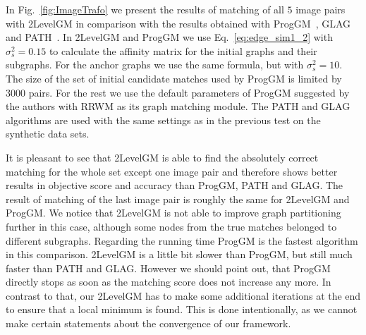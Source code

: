 In Fig.~\ref{fig:ImageTrafo} we present the results of matching of all $5$ image pairs with 2LevelGM in comparison with the results obtained with ProgGM~\cite{Cho2012_ProgressiveGM}, GLAG~\cite{Fiori2013_GLAG} and PATH~\cite{Zazlavskiy2008_PATH}. %
In 2LevelGM and ProgGM we use Eq.~\eqref{eq:edge_sim1_2} with $\sigma_s^2=0.15$ to calculate the affinity matrix for the initial graphs and their subgraphs. For the anchor graphs we use the same formula, but with $\sigma^2_s=10$. The size of the set of initial candidate matches used by ProgGM is limited by $3000$ pairs. For the rest we use the default parameters of ProgGM suggested by the authors with RRWM as its graph matching module. The PATH and GLAG algorithms are used with the same settings as in the previous test on the synthetic data sets.

It is pleasant to see that 2LevelGM is able to find the absolutely correct matching for the whole set except one image pair and therefore shows better results in objective score and accuracy than ProgGM, PATH and GLAG. The result of matching of the last image pair is roughly the same for 2LevelGM and ProgGM. We notice that 2LevelGM is not able to improve graph partitioning further in this case, although some nodes from the true matches belonged to different subgraphs. Regarding the running time ProgGM is the fastest algorithm in this comparison. 2LevelGM is a little bit slower than ProgGM, but still much faster than PATH and GLAG. However we should point out, that ProgGM directly stops as soon as the matching score does not increase any more. In contrast to that, our 2LevelGM has to make some additional iterations at the end to ensure that a local minimum is found. This is done intentionally, as we cannot make certain statements about the convergence of our framework.

